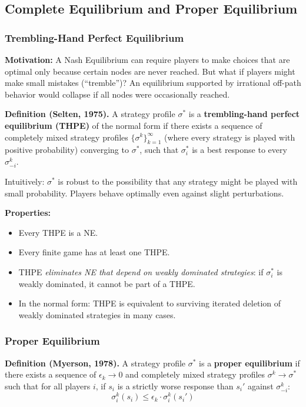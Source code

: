 \documentclass[hidelinks]{article}
\begin{document}
\subsection{Complete Equilibrium and Proper Equilibrium}

\subsubsection{Trembling-Hand Perfect Equilibrium}

\textbf{Motivation:} A Nash Equilibrium can require players to make choices that are optimal only because certain nodes are never reached. But what if players might make small mistakes (``tremble'')? An equilibrium supported by irrational off-path behavior would collapse if all nodes were occasionally reached.

\textbf{Definition (Selten, 1975).} A strategy profile $\sigma^*$ is a \textbf{trembling-hand perfect equilibrium (THPE)} of the normal form if there exists a sequence of completely mixed strategy profiles $\{\sigma^k\}_{k=1}^\infty$ (where every strategy is played with positive probability) converging to $\sigma^*$, such that $\sigma_i^*$ is a best response to every $\sigma_{-i}^k$.

Intuitively: $\sigma^*$ is robust to the possibility that any strategy might be played with small probability. Players behave optimally even against slight perturbations.

\textbf{Properties:}
\begin{itemize}
    \item Every THPE is a NE.
    \item Every finite game has at least one THPE.
    \item THPE \textit{eliminates NE that depend on weakly dominated strategies}: if $\sigma_i^*$ is weakly dominated, it cannot be part of a THPE.
    \item In the normal form: THPE is equivalent to surviving iterated deletion of weakly dominated strategies in many cases.
\end{itemize}

\subsubsection{Proper Equilibrium}

\textbf{Definition (Myerson, 1978).} A strategy profile $\sigma^*$ is a \textbf{proper equilibrium} if there exists a sequence of $\epsilon_k \to 0$ and completely mixed strategy profiles $\sigma^k \to \sigma^*$ such that for all players $i$, if $s_i$ is a strictly worse response than $s_i'$ against $\sigma_{-i}^k$:
\[
\sigma_i^k(s_i) \leq \epsilon_k \cdot \sigma_i^k(s_i')
\]
\end{document}
